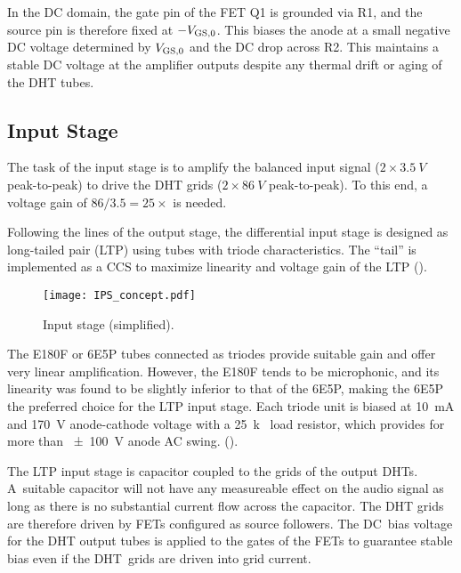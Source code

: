 In the DC domain, the gate pin of the FET Q1 is grounded via R1, and the source pin is therefore fixed at $-V_{\rm GS,0}$. This biases the anode at a small negative DC voltage determined by $V_{\rm GS,0}$ and the DC drop across R2. This maintains a stable DC voltage at the amplifier outputs despite any thermal drift or aging of the DHT tubes.


\subsection{Input Stage}

The task of the input stage is to amplify the balanced input signal ($2 \times \SI{3.5}{V}$ peak-to-peak) to drive the DHT grids ($2 \times \SI{86}{V}$ peak-to-peak). To this end, a voltage gain of $86 / 3.5 = 25\times$ is needed.\par

Following the lines of the output stage, the differential input stage is designed as long-tailed pair (LTP)\cite{valvewizard_LTP} using tubes with triode characteristics. The ``tail'' is implemented as a CCS to maximize linearity and voltage gain of the LTP ().

\begin{figure}
\begin{center}
\texttt{[image: IPS\_concept.pdf]}
\caption{Input stage (simplified).}
\end{center}
\end{figure}

The E180F or 6E5P tubes connected as triodes provide suitable gain and offer very linear amplification\cite{bartola_thdbenchmark,millett_pentodes,klausmobile_testerfiles}. However, the E180F tends to be microphonic\cite{osdeha_p23}, and its linearity was found to be slightly inferior to that of the 6E5P\cite{osdeha_p32}, making the 6E5P the preferred choice for the LTP input stage. Each triode unit is biased at \SI{10}{mA} and \SI{170}{V} anode-cathode voltage with a \SI{25}{k\Ohm} load resistor, which provides for more than \SI{\pm100}{V} anode AC swing. ().

The LTP input stage is capacitor coupled to the grids of the output DHTs. A suitable capacitor will not have any measureable effect on the audio signal\cite{bateman_caps_distortion} as long as there is no substantial current flow across the capacitor\cite{aiken_farting_out}. The DHT grids are therefore driven by FETs configured as source followers. The DC bias voltage for the DHT output tubes is applied to the gates of the FETs to guarantee stable bias even if the DHT grids are driven into grid current.

